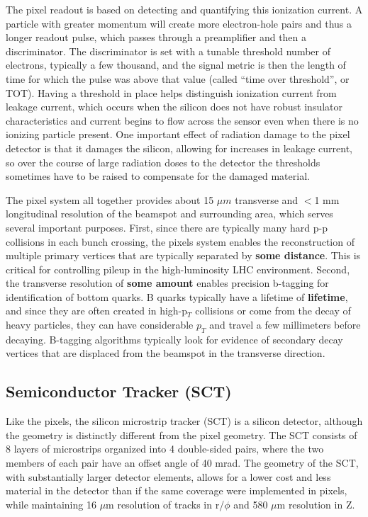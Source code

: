\documentclass[11pt]{article}
\begin{document}
The pixel readout is based on detecting and quantifying this ionization current.  A particle with greater momentum will create more electron-hole pairs and thus a longer readout pulse, which passes through a preamplifier and then a discriminator.  The discriminator is set with a tunable threshold number of electrons, typically a few thousand, and the signal metric is then the length of time for which the pulse was above that value (called ``time over threshold'', or TOT).  Having a threshold in place helps distinguish ionization current from leakage current, which occurs when the silicon does not have robust insulator characteristics and current begins to flow across the sensor even when there is no ionizing particle present.  One important effect of radiation damage to the pixel detector is that it damages the silicon, allowing for increases in leakage current, so over the course of large radiation doses to the detector the thresholds sometimes have to be raised to compensate for the damaged material.  

The pixel system all together provides about 15 $\mu m$ transverse and $<$1 mm longitudinal resolution of the beamspot and surrounding area, which serves several important purposes.  First, since there are typically many hard p-p collisions in each bunch crossing, the pixels system enables the reconstruction of multiple primary vertices that are typically separated by \textbf{some distance}.  This is critical for controlling pileup in the high-luminosity LHC environment.  Second, the transverse resolution of \textbf{some amount} enables precision b-tagging for identification of bottom quarks.  B quarks typically have a lifetime of \textbf{lifetime}, and since they are often created in high-p$_T$ collisions or come from the decay of heavy particles, they can have considerable $p_T$ and travel a few millimeters before decaying.  B-tagging algorithms typically look for evidence of secondary decay vertices that are displaced from the beamspot in the transverse direction.   

\subsection{Semiconductor Tracker (SCT)}
Like the pixels, the silicon microstrip tracker (SCT) is a silicon detector, although the geometry is distinctly different from the pixel geometry.  The SCT consists of 8 layers of microstrips organized into 4 double-sided pairs, where the two members of each pair have an offset angle of 40 mrad.  The geometry of the SCT, with substantially larger detector elements, allows for a lower cost and less material in the detector than if the same coverage were implemented in pixels, while maintaining 16 $\mu$m resolution of tracks in r/$\phi$ and 580 $\mu$m resolution in Z.   
\end{document}
